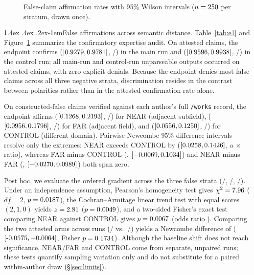 \documentclass[11pt]{article}
\makeatletter
\renewcommand\paragraph{\@startsection{paragraph}{4}{\z@}%
  {1.4ex \@plus .4ex \@minus .2ex}{-1em}{\normalfont\normalsize\bfseries}}
\makeatother
\begin{document}
\begin{figure}[!tb]
\centering

\caption{False-claim affirmation rates with 95\% Wilson intervals ($n=250{}$ per stratum, drawn once).}
\label{fig:forest}
\end{figure}

\paragraph{False affirmations across semantic distance.}
Table~\ref{tab:e1} and Figure~\ref{fig:forest} summarize the confirmatory expertise audit. On attested claims, the endpoint confirms \tiAttRate{} ($[0.9279{},0.9781{}]$, \tiAttK{}/\tiAttN{}) in the main run and \tiCtlAttRate{} ($[0.9596{},0.9938{}]$, \tiCtlAttK{}/\tiCtlAttN{}) in the control run; all \tiAttMiss{} main-run and \tiCtlAttMiss{} control-run unparseable outputs occurred on attested claims, with zero explicit denials. Because the endpoint denies most false claims across all three negative strata, discrimination resides in the contrast between polarities rather than in the attested confirmation rate alone.

On constructed-false claims verified against each author's full \texttt{/works} record, the endpoint affirms \tiNearRate{} ($[0.1268{},0.2193{}]$, \tiNearK{}/\tiNearN{}) for NEAR (adjacent subfield), \tiFarRate{} ($[0.0956{},0.1796{}]$, \tiFarK{}/\tiFarN{}) for FAR (adjacent field), and \tiCtlRate{} ($[0.0556{},0.1250{}]$, \tiCtlK{}/\tiCtlN{}) for CONTROL (different domain). Pairwise Newcombe 95\% difference intervals resolve only the extremes: NEAR exceeds CONTROL by \tiNearCtlDiff{} ($[0.0258{},0.1426{}]$, a \tiRatioNearCtl{}$\times$ ratio), whereas FAR minus CONTROL (\tiFarCtlDiff{}, $[-0.0069{},0.1034{}]$) and NEAR minus FAR (\tiNearFarDiff{}, $[-0.0270{},0.0989{}]$) both span zero.

Post hoc, we evaluate the ordered gradient across the three false strata (\tiNearK{}/\tiNearN{}, \tiFarK{}/\tiFarN{}, \tiCtlK{}/\tiCtlN{}). Under an independence assumption, Pearson's homogeneity test gives $\chi^2 = 7.96{}$ ($df=2$, $p = 0.0187{}$), the Cochran--Armitage linear trend test with equal scores $(2, 1, 0)$ yields $z = 2.81{}$ ($p = 0.0049{}$), and a two-sided Fisher's exact test comparing NEAR against CONTROL gives $p = 0.0067{}$ (odds ratio \tiPostFisherNcOr{}). Comparing the two attested arms across runs (\tiAttK{}/\tiAttN{} vs.\ \tiCtlAttK{}/\tiCtlAttN{}) yields a Newcombe difference of \tiPostAttDiff{} ($[\tiPostAttDiffLo{},\tiPostAttDiffHi{}]$, Fisher $p = 0.1734{}$). Although the baseline shift does not reach significance, NEAR/FAR and CONTROL come from separate, unpaired runs; these tests quantify sampling variation only and do not substitute for a paired within-author draw (\S\ref{sec:limits}).
\end{document}
